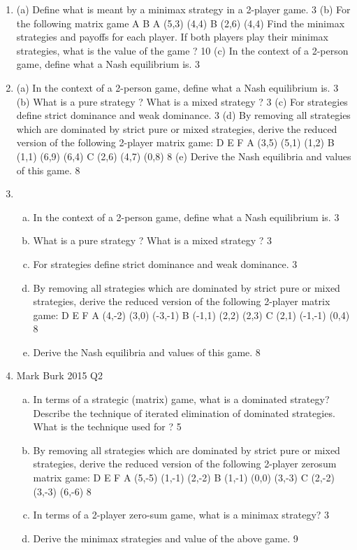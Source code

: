 \documentclass[]{article}
\begin{document}
\begin{enumerate}
\item (a) Define what is meant by a minimax strategy in a 2-player game. 3 %
(b) For the following matrix game
A B
A (5,3) (4,4)
B (2,6) (4,4)
Find the minimax strategies and payoffs for each player. If both players
play their minimax strategies, what is the value of the game ? 10 %
(c) In the context of a 2-person game, define what a Nash equilibrium is. 3 %
\item (a) In the context of a 2-person game, define what a Nash equilibrium is. 3
(b) What is a pure strategy ? What is a mixed strategy ? 3
(c) For strategies define strict dominance and weak dominance. 3
(d) By removing all strategies which are dominated by strict pure or mixed
strategies, derive the reduced version of the following 2-player matrix
game:
D E F
A (3,5) (5,1) (1,2)
B (1,1) (6,9) (6,4)
C (2,6) (4,7) (0,8)
8
(e) Derive the Nash equilibria and values of this game. 8
\item 

\begin{enumerate}[(a)]
\item In the context of a 2-person game, define what a Nash equilibrium is. 3
\item What is a pure strategy ? What is a mixed strategy ? 3
\item For strategies define strict dominance and weak dominance. 3
\item By removing all strategies which are dominated by strict pure or mixed
strategies, derive the reduced version of the following 2-player matrix
game:
D E F
A (4,-2) (3,0) (-3,-1)
B (-1,1) (2,2) (2,3)
C (2,1) (-1,-1) (0,4)
8
\item  Derive the Nash equilibria and values of this game. 8
\end{enumerate}

\item Mark Burk 2015 Q2
\begin{enumerate}[(a)]
\item  In terms of a strategic (matrix) game, what is a dominated strategy?
Describe the technique of iterated elimination of dominated strategies.
What is the technique used for ? 5
\item By removing all strategies which are dominated by strict pure or mixed
strategies, derive the reduced version of the following 2-player zerosum
matrix game:
D E F
A (5,-5) (1,-1) (2,-2)
B (1,-1) (0,0) (3,-3)
C (2,-2) (3,-3) (6,-6)
8
\item In terms of a 2-player zero-sum game, what is a minimax strategy? 3
\item Derive the minimax strategies and value of the above game. 9
\end{enumerate}




\end{enumerate}
\end{document}
